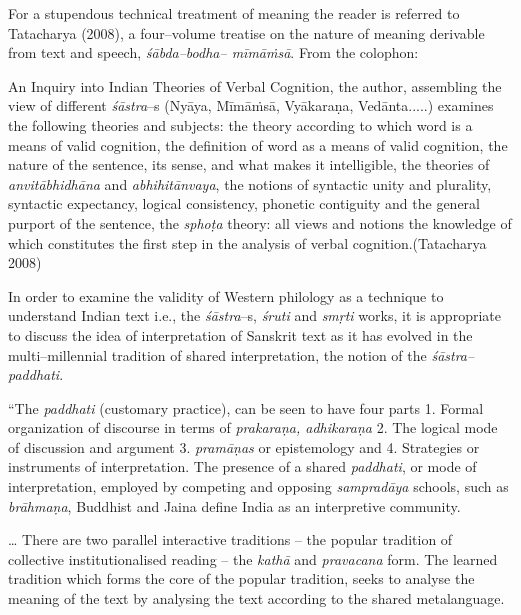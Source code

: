 For a stupendous technical treatment of meaning the reader is referred to Tatacharya (2008), a four–volume treatise on the nature of meaning derivable from text and speech, \textit{śābda–bodha– mīmāṁsā}. From the colophon:

\begin{myquote}
An Inquiry into Indian Theories of Verbal Cognition, the author, assembling the view of different \textit{śāstra}–s (Nyāya, Mīmāṁsā, Vyākaraṇa, Vedānta.....) examines the following theories and subjects: the theory according to which word is a means of valid cognition, the definition of word as a means of valid cognition, the nature of the sentence, its sense, and what makes it intelligible, the theories of \textit{anvitābhidhāna} and \textit{abhihitānvaya}, the notions of syntactic unity and plurality, syntactic expectancy, logical consistency, phonetic contiguity and the general purport of the sentence, the \textit{sphoṭa} theory: all views and notions the knowledge of which constitutes the first step in the analysis of verbal cognition.\hfill (Tatacharya 2008)
\end{myquote}

In order to examine the validity of Western philology as a technique to understand Indian text i.e., the \textit{śāstra}–s, \textit{śruti} and \textit{smṛti} works, it is appropriate to discuss the idea of interpretation of Sanskrit text as it has evolved in the multi–millennial tradition of shared interpretation, the notion of the \textit{śāstra–paddhati}.

\begin{myquote}
“The \textit{paddhati} (customary practice), can be seen to have four parts 1. Formal organization of discourse in terms of \textit{prakaraṇa, adhikaraṇa} 2. The logical mode of discussion and argument 3. \textit{pramāṇas} or epistemology and 4. Strategies or instruments of interpretation. The presence of a shared \textit{paddhati}, or mode of interpretation, employed by competing and opposing \textit{sampradāya} schools, such as \textit{brāhmaṇa}, Buddhist and Jaina define India as an interpretive community.
\end{myquote}

\begin{myquote}
… There are two parallel interactive traditions – the popular tradition of collective institutionalised reading – the \textit{kathā} and \textit{pravacana} form. The learned tradition which forms the core of the popular tradition, seeks to analyse the meaning of the text by analysing the text according to the shared metalanguage.
\end{myquote}

